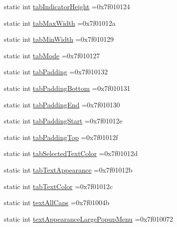 \begin{DoxyCompactItemize}
\item 
static int \hyperlink{classandroid_1_1support_1_1design_1_1R_1_1attr_a690f28988df1557974bcfc4bd4e877a9}{tab\+Indicator\+Height} =0x7f010124
\item 
static int \hyperlink{classandroid_1_1support_1_1design_1_1R_1_1attr_a650581c154950889e3bd6241f121f180}{tab\+Max\+Width} =0x7f01012a
\item 
static int \hyperlink{classandroid_1_1support_1_1design_1_1R_1_1attr_aeebab001b7ec8560a919d37c4732c6e9}{tab\+Min\+Width} =0x7f010129
\item 
static int \hyperlink{classandroid_1_1support_1_1design_1_1R_1_1attr_aa7fc1fe2e9256dc49e7439e5799302d3}{tab\+Mode} =0x7f010127
\item 
static int \hyperlink{classandroid_1_1support_1_1design_1_1R_1_1attr_a1d4456538a96cc563b1041fe9af458b5}{tab\+Padding} =0x7f010132
\item 
static int \hyperlink{classandroid_1_1support_1_1design_1_1R_1_1attr_a4daed894a5c7b644541f7c480e446a66}{tab\+Padding\+Bottom} =0x7f010131
\item 
static int \hyperlink{classandroid_1_1support_1_1design_1_1R_1_1attr_a0c324f3c1cbd6bf57bac7ae27b2c4d0b}{tab\+Padding\+End} =0x7f010130
\item 
static int \hyperlink{classandroid_1_1support_1_1design_1_1R_1_1attr_aff6098bfa08bb8d7dbaafe9d1ef8feb6}{tab\+Padding\+Start} =0x7f01012e
\item 
static int \hyperlink{classandroid_1_1support_1_1design_1_1R_1_1attr_a0a45c9281015bec36a61c5dc4cdaa0b5}{tab\+Padding\+Top} =0x7f01012f
\item 
static int \hyperlink{classandroid_1_1support_1_1design_1_1R_1_1attr_aabda887914ba6ed007645ca2c65c3d90}{tab\+Selected\+Text\+Color} =0x7f01012d
\item 
static int \hyperlink{classandroid_1_1support_1_1design_1_1R_1_1attr_a9f7da107b74efc58026aa10f8acfd26c}{tab\+Text\+Appearance} =0x7f01012b
\item 
static int \hyperlink{classandroid_1_1support_1_1design_1_1R_1_1attr_ab79720c0734d6fa212a2e7530837aa6e}{tab\+Text\+Color} =0x7f01012c
\item 
static int \hyperlink{classandroid_1_1support_1_1design_1_1R_1_1attr_ab79e12973dd7b26f7ad9ef87ae44ecfa}{text\+All\+Caps} =0x7f01004b
\item 
static int \hyperlink{classandroid_1_1support_1_1design_1_1R_1_1attr_aa64eaeed4304e517cca3d5dba09f339e}{text\+Appearance\+Large\+Popup\+Menu} =0x7f010072
\item 

\end{DoxyCompactItemize}
